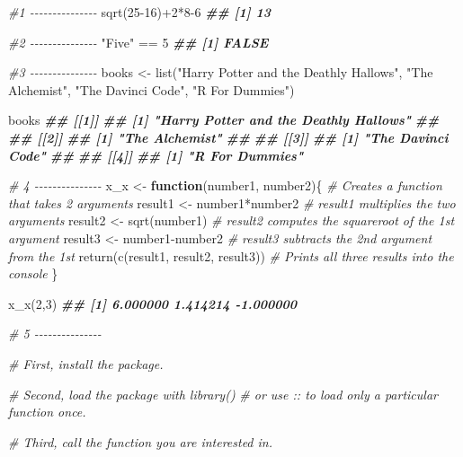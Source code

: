 \documentclass[
]{book}
\newenvironment{Shaded}{\begin{snugshade}}{\end{snugshade}}
\newcommand{\CommentTok}[1]{\textcolor[rgb]{0.56,0.35,0.01}{\textit{#1}}}
\newcommand{\ControlFlowTok}[1]{\textcolor[rgb]{0.13,0.29,0.53}{\textbf{#1}}}
\newcommand{\DecValTok}[1]{\textcolor[rgb]{0.00,0.00,0.81}{#1}}
\newcommand{\DocumentationTok}[1]{\textcolor[rgb]{0.56,0.35,0.01}{\textbf{\textit{#1}}}}
\newcommand{\FunctionTok}[1]{\textcolor[rgb]{0.00,0.00,0.00}{#1}}
\newcommand{\NormalTok}[1]{#1}
\newcommand{\OtherTok}[1]{\textcolor[rgb]{0.56,0.35,0.01}{#1}}
\newcommand{\SpecialCharTok}[1]{\textcolor[rgb]{0.00,0.00,0.00}{#1}}
\newcommand{\StringTok}[1]{\textcolor[rgb]{0.31,0.60,0.02}{#1}}
\begin{document}
\begin{Shaded}
\begin{Highlighting}[]
\CommentTok{\#1 {-}{-}{-}{-}{-}{-}{-}{-}{-}{-}{-}{-}{-}{-}{-}}
\FunctionTok{sqrt}\NormalTok{(}\DecValTok{25{-}16}\NormalTok{)}\SpecialCharTok{+}\DecValTok{2}\SpecialCharTok{*}\DecValTok{8{-}6}
\DocumentationTok{\#\# [1] 13}

\CommentTok{\#2 {-}{-}{-}{-}{-}{-}{-}{-}{-}{-}{-}{-}{-}{-}{-}}
\StringTok{"Five"} \SpecialCharTok{==} \DecValTok{5}
\DocumentationTok{\#\# [1] FALSE}

\CommentTok{\#3 {-}{-}{-}{-}{-}{-}{-}{-}{-}{-}{-}{-}{-}{-}{-}}
\NormalTok{books }\OtherTok{\textless{}{-}} \FunctionTok{list}\NormalTok{(}\StringTok{"Harry Potter and the Deathly Hallows"}\NormalTok{,}
              \StringTok{"The Alchemist"}\NormalTok{,}
              \StringTok{"The Davinci Code"}\NormalTok{,}
              \StringTok{"R For Dummies"}\NormalTok{)}

\NormalTok{books}
\DocumentationTok{\#\# [[1]]}
\DocumentationTok{\#\# [1] "Harry Potter and the Deathly Hallows"}
\DocumentationTok{\#\# }
\DocumentationTok{\#\# [[2]]}
\DocumentationTok{\#\# [1] "The Alchemist"}
\DocumentationTok{\#\# }
\DocumentationTok{\#\# [[3]]}
\DocumentationTok{\#\# [1] "The Davinci Code"}
\DocumentationTok{\#\# }
\DocumentationTok{\#\# [[4]]}
\DocumentationTok{\#\# [1] "R For Dummies"}

\CommentTok{\# 4 {-}{-}{-}{-}{-}{-}{-}{-}{-}{-}{-}{-}{-}{-}{-}}
\NormalTok{x\_x }\OtherTok{\textless{}{-}} \ControlFlowTok{function}\NormalTok{(number1, number2)\{       }\CommentTok{\# Creates a function that takes 2 arguments}
\NormalTok{  result1 }\OtherTok{\textless{}{-}}\NormalTok{ number1}\SpecialCharTok{*}\NormalTok{number2             }\CommentTok{\# result1 multiplies the two arguments}
\NormalTok{  result2 }\OtherTok{\textless{}{-}} \FunctionTok{sqrt}\NormalTok{(number1)               }\CommentTok{\# result2 computes the squareroot of the 1st argument}
\NormalTok{  result3 }\OtherTok{\textless{}{-}}\NormalTok{ number1}\SpecialCharTok{{-}}\NormalTok{number2             }\CommentTok{\# result3 subtracts the 2nd argument from the 1st}
  \FunctionTok{return}\NormalTok{(}\FunctionTok{c}\NormalTok{(result1, result2, result3))   }\CommentTok{\# Prints all three results into the console}
\NormalTok{\} }

\FunctionTok{x\_x}\NormalTok{(}\DecValTok{2}\NormalTok{,}\DecValTok{3}\NormalTok{)}
\DocumentationTok{\#\# [1]  6.000000  1.414214 {-}1.000000}

\CommentTok{\# 5 {-}{-}{-}{-}{-}{-}{-}{-}{-}{-}{-}{-}{-}{-}{-}}

\CommentTok{\# First, install the package.}

\CommentTok{\# Second, load the package with \textquotesingle{}library()\textquotesingle{}}
\CommentTok{\#         or use \textquotesingle{}::\textquotesingle{} to load only a particular function once.}

\CommentTok{\# Third, call the function you are interested in.}
\end{Highlighting}
\end{Shaded}


  
\end{document}
